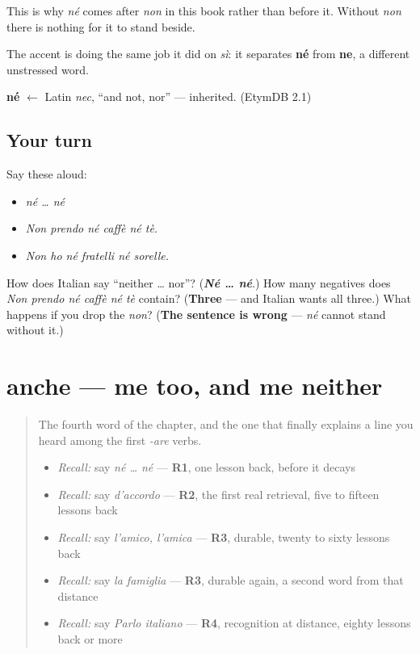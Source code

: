 This is why \emph{né} comes after \emph{non} in this book rather than before it. Without \emph{non} there is nothing for it to stand beside.

The accent is doing the same job it did on \emph{sì}: it separates \textbf{né} from \textbf{ne}, a different unstressed word.

\begin{cousinweb}
\textbf{né} $\leftarrow$ Latin \emph{nec}, \textquotedblleft{}and not, nor\textquotedblright{} — inherited. (EtymDB 2.1)
\end{cousinweb}

\subsection*{Your turn}
Say these aloud:

\begin{itemize}
\raggedright
  \item \emph{né … né}
  \item \emph{Non prendo né caffè né tè.}
  \item \emph{Non ho né fratelli né sorelle.}
\end{itemize}

\begin{tcolorbox}[breakable,colback=teal!4,colframe=teal!35!black,title={Before you move on}]
How does Italian say \textquotedblleft{}neither … nor\textquotedblright{}? (\emph{\textbf{Né … né}}.) How many negatives does \emph{Non prendo né caffè né tè} contain? (\textbf{Three} — and Italian wants all three.) What happens if you drop the \emph{non}? (\textbf{The sentence is wrong} — \emph{né} cannot stand without it.)
\end{tcolorbox}
\section[anche / neanche]{anche — me too, and me neither}

\label{lesson:IT-C30-anche}



\begin{quote}
The fourth word of the chapter, and the one that finally explains a line you heard among the first \emph{-are} verbs.

\begin{itemize}
\raggedright
  \item \emph{Recall:} say \emph{né … né} — \textbf{R1}, one lesson back, before it decays
  \item \emph{Recall:} say \emph{d'accordo} — \textbf{R2}, the first real retrieval, five to fifteen lessons back
  \item \emph{Recall:} say \emph{l'amico, l'amica} — \textbf{R3}, durable, twenty to sixty lessons back
  \item \emph{Recall:} say \emph{la famiglia} — \textbf{R3}, durable again, a second word from that distance
  \item \emph{Recall:} say \emph{Parlo italiano} — \textbf{R4}, recognition at distance, eighty lessons back or more
\end{itemize}
\end{quote}

